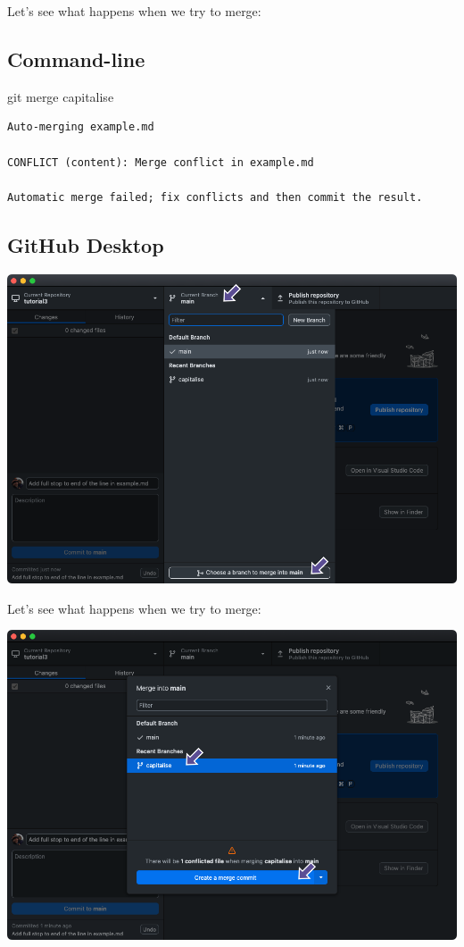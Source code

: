 \documentclass[
  letterpaper,
  DIV=11,
  numbers=noendperiod]{scrartcl}
\newenvironment{Shaded}{\begin{snugshade}}{\end{snugshade}}
\newcommand{\NormalTok}[1]{\textcolor[rgb]{0.00,0.23,0.31}{#1}}
\begin{document}
Let's see what happens when we try to merge:

\subsection{Command-line}

\begin{Shaded}
\begin{Highlighting}[]
\NormalTok{git merge capitalise}
\end{Highlighting}
\end{Shaded}

\begin{verbatim}
Auto-merging example.md

CONFLICT (content): Merge conflict in example.md

Automatic merge failed; fix conflicts and then commit the result.
\end{verbatim}

\subsection{GitHub Desktop}

\includegraphics{images/image51.png}

Let's see what happens when we try to merge:

\includegraphics{images/image52.png}
\end{document}
